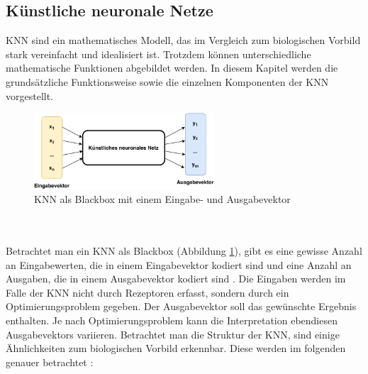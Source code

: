\subsection{Künstliche neuronale Netze}
\ac{KNN} sind ein mathematisches Modell, das im Vergleich zum biologischen Vorbild stark vereinfacht und idealisiert ist. Trotzdem können unterschiedliche mathematische Funktionen abgebildet werden. In diesem Kapitel werden die grundsätzliche Funktionsweise sowie die einzelnen Komponenten der \ac{KNN} vorgestellt.
\begin{figure}[h]
	\centering
	\includegraphics[width=0.6\textwidth]{./img/neural_network_basics/NeuralNetworkBlackbox.pdf} 
	\caption{KNN als Blackbox mit einem Eingabe- und Ausgabevektor}
	\label{fig:neural_network_blackbox}
\end{figure}
\\\\
Betrachtet man ein \ac{KNN} als Blackbox (Abbildung \ref{fig:neural_network_blackbox}), gibt es eine gewisse Anzahl an Eingabewerten, die in einem Eingabevektor kodiert sind und eine Anzahl an Ausgaben, die in einem Ausgabevektor kodiert sind \cite{scherer2013neuronale}. Die Eingaben werden im Falle der \ac{KNN} nicht durch Rezeptoren erfasst, sondern durch ein Optimierungsproblem gegeben. Der Ausgabevektor soll das gewünschte Ergebnis enthalten. Je nach Optimierungsproblem kann die Interpretation ebendiesen Ausgabevektors variieren. Betrachtet man die Struktur der \ac{KNN}, sind einige Ähnlichkeiten zum biologischen Vorbild erkennbar. Diese werden im folgenden genauer betrachtet \cite{zell2003simulation}:
